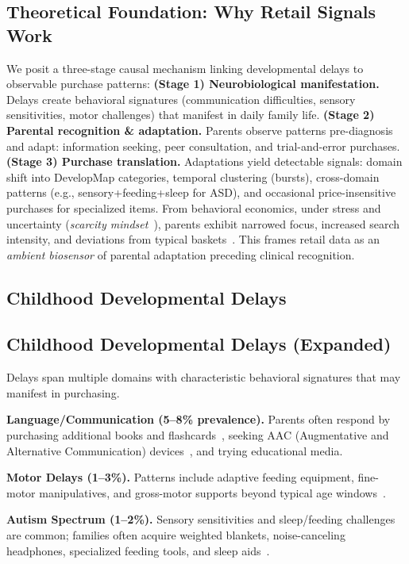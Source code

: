 \documentclass[conference]{IEEEtran}
\theoremstyle{plain}
\theoremstyle{remark}
\begin{document}
\subsection{Theoretical Foundation: Why Retail Signals Work}\label{sec:theory}
We posit a three-stage causal mechanism linking developmental delays to observable purchase patterns:
\textbf{(Stage 1) Neurobiological manifestation.} Delays create behavioral signatures (communication difficulties, sensory sensitivities, motor challenges) that manifest in daily family life.
\textbf{(Stage 2) Parental recognition \& adaptation.} Parents observe patterns pre-diagnosis and adapt: information seeking, peer consultation, and trial-and-error purchases.
\textbf{(Stage 3) Purchase translation.} Adaptations yield detectable signals: domain shift into DevelopMap categories, temporal clustering (bursts), cross-domain patterns (e.g., sensory+feeding+sleep for ASD), and occasional price-insensitive purchases for specialized items.
From behavioral economics, under stress and uncertainty (\emph{scarcity mindset}~\cite{scarcity,mhealth1}), parents exhibit narrowed focus, increased search intensity, and deviations from typical baskets~\cite{mhealth2}. This frames retail data as an \emph{ambient biosensor} of parental adaptation preceding clinical recognition.
\label{sec:related}
\subsection{Childhood Developmental Delays}
\subsection{Childhood Developmental Delays (Expanded)}
Delays span multiple domains with characteristic behavioral signatures that may manifest in purchasing.

\textbf{Language/Communication (5--8\% prevalence).}
Parents often respond by purchasing additional books and flashcards~\cite{earlylit}, seeking AAC (Augmentative and Alternative Communication) devices~\cite{aacreview}, and trying educational media.

\textbf{Motor Delays (1--3\%).}
Patterns include adaptive feeding equipment, fine-motor manipulatives, and gross-motor supports beyond typical age windows~\cite{motordev}.

\textbf{Autism Spectrum (1--2\%).}
Sensory sensitivities and sleep/feeding challenges are common; families often acquire weighted blankets, noise-canceling headphones, specialized feeding tools, and sleep aids~\cite{sensoryreview,sleepasd}.
\end{document}
